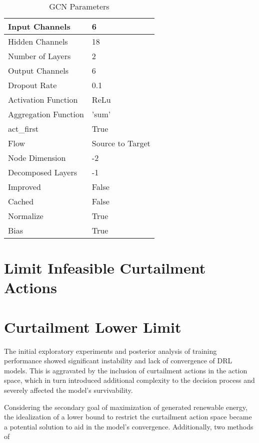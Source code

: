 \begin{table}
	\begin{tabular}{|l|l|}
		\hline
		Input Channels & 6 \\
		\hline
		Hidden Channels & 18 \\
		\hline
		Number of Layers & 2 \\
		\hline
		Output Channels & 6 \\
		\hline
		Dropout Rate & 0.1 \\
		\hline
		Activation Function & ReLu \\
		 \hline
		Aggregation Function & 'sum' \\
		\hline
		act\_first & True \\
		\hline
		Flow & Source to Target \\
		\hline
		Node Dimension & -2 \\
		\hline 
		Decomposed Layers & -1 \\
		\hline
		Improved & False \\
		\hline
		Cached & False \\
		\hline
		Normalize & True \\
		\hline
		Bias & True \\		
		\hline
	\end{tabular}
	\caption{\ac{GCN} Parameters}
\end{table}

\section{Limit Infeasible Curtailment Actions} \label{sec:limit-infeasible}

\section{Curtailment Lower Limit} \label{sec:curtailment-lower-limit}

The initial exploratory experiments and posterior analysis of training performance showed significant instability and lack of convergence of \ac{DRL} models. This is aggravated by the inclusion of curtailment actions in the action space, which in turn introduced additional complexity to the decision process and severely affected the model's survivability. 
\par
Considering the secondary goal of maximization of generated renewable energy, the idealization of a lower bound to restrict the curtailment action space became a potential solution to aid in the model's convergence. Additionally, two methods of 

